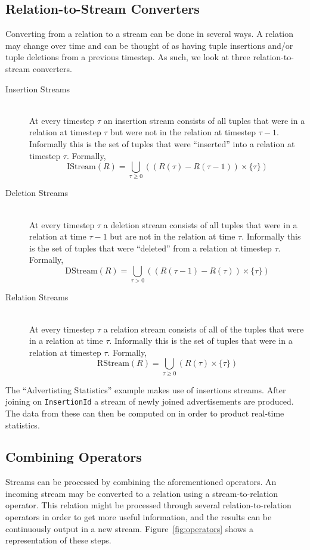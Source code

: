 \documentclass[a4paper, 10pt, conference]{IEEEconf}
\begin{document}
\subsection{Relation-to-Stream Converters}
Converting from a relation to a stream can be done in several ways.  A relation may change over time and can be thought of as having tuple insertions and/or tuple deletions from a previous timestep.  As such, we look at three relation-to-stream converters.  

\begin{description}
    \item[Insertion Streams] \hfill \\
    At every timestep $\tau$ an insertion stream consists of all tuples that were in a relation at timestep $\tau$ but were not in the relation at timestep $\tau - 1$.  Informally this is the set of tuples that were ``inserted'' into a relation at timestep $\tau$. Formally,
    $$\text{IStream}(R) = \bigcup_{\tau \geq 0} ((R(\tau) - R(\tau - 1)) \times \{\tau\})$$

    \item[Deletion Streams] \hfill \\
    At every timestep $\tau$ a deletion stream consists of all tuples that were in a relation at time $\tau - 1$ but are not in the relation at time $\tau$. Informally this is the set of tuples that were ``deleted'' from a relation at timestep $\tau$. Formally, 
    $$\text{DStream}(R) = \bigcup_{\tau > 0} ((R(\tau - 1) - R(\tau)) \times \{\tau\})$$

    \item[Relation Streams] \hfill \\
    At every timestep $\tau$ a relation stream consists of all of the tuples that were in a relation at time $\tau$.  Informally this is the set of tuples that were in a relation at timestep $\tau$. Formally, 
    $$\text{RStream}(R) = \bigcup_{\tau \geq 0} (R(\tau) \times \{\tau\})$$

\end{description}

The ``Advertisting Statistics'' example makes use of insertions streams.  After joining on \texttt{InsertionId} a stream of newly joined advertisements are produced.  The data from these can then be computed on in order to product real-time statistics.

\subsection{Combining Operators}
Streams can be processed by combining the aforementioned operators.  An incoming stream may be converted to a relation using a stream-to-relation operator.  This relation might be processed through several relation-to-relation operators in order to get more useful information, and the results can be continuously output in a new stream.  Figure~\ref{fig:operators} shows a representation of these steps.
\end{document}

